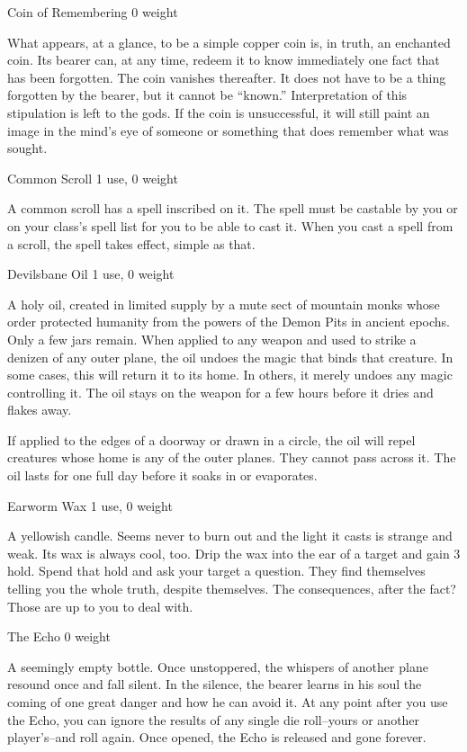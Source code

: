  Coin of Remembering 0 weight


 What appears, at a glance, to be a simple copper coin is, in truth, an enchanted coin. Its bearer can, at any time, redeem it to know immediately one fact that has been forgotten. The coin vanishes thereafter. It does not have to be a thing forgotten by the bearer, but it cannot be ``known.'' Interpretation of this stipulation is left to the gods. If the coin is unsuccessful, it will still paint an image in the mind's eye of someone or something that does remember what was sought.


 Common Scroll 1 use, 0 weight


 A common scroll has a spell inscribed on it. The spell must be castable by you or on your class's spell list for you to be able to cast it. When you cast a spell from a scroll, the spell takes effect, simple as that.


 Devilsbane Oil 1 use, 0 weight


 A holy oil, created in limited supply by a mute sect of mountain monks whose order protected humanity from the powers of the Demon Pits in ancient epochs. Only a few jars remain. When applied to any weapon and used to strike a denizen of any outer plane, the oil undoes the magic that binds that creature. In some cases, this will return it to its home. In others, it merely undoes any magic controlling it. The oil stays on the weapon for a few hours before it dries and flakes away.


 If applied to the edges of a doorway or drawn in a circle, the oil will repel creatures whose home is any of the outer planes. They cannot pass across it. The oil lasts for one full day before it soaks in or evaporates.


 Earworm Wax 1 use, 0 weight


 A yellowish candle. Seems never to burn out and the light it casts is strange and weak. Its wax is always cool, too. Drip the wax into the ear of a target and gain 3 hold. Spend that hold and ask your target a question. They find themselves telling you the whole truth, despite themselves. The consequences, after the fact? Those are up to you to deal with.


 The Echo 0 weight


 A seemingly empty bottle. Once unstoppered, the whispers of another plane resound once and fall silent. In the silence, the bearer learns in his soul the coming of one great danger and how he can avoid it. At any point after you use the Echo, you can ignore the results of any single die roll--yours or another player's--and roll again. Once opened, the Echo is released and gone forever.


